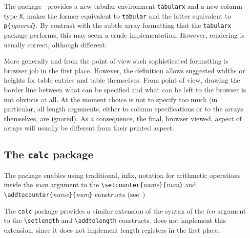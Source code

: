 The 
package~\cite[Section~5.3.5]{latexbis} provides a new tabular
environment \verb+tabularx+ and a new column type \verb+X+. \hevea{}
makes the former equivalent to \verb+tabular+ and the latter
equivalent to \verb+p{+\textit{ignored}\verb+}+.  By contrast with the
subtle array formatting that the \texttt{tabularx} package performs,
this may seem a crude implementation.  However, rendering is usually
correct, although different.

More generally and from the \html{} point of view such sophisticated
formatting is browser job in the first place.
However, the \html{} definition allows suggested widths or heights for
table entries and table themselves.
From \hevea{} point of view, drawing the border line between what can be
specified and what can be left to the browser is not obvious at all.
At the moment \hevea{} choice is not to specify too much (in
particular, all length
arguments, either to column specifications or to the arrays
themselves, are ignored). As a consequence, the final, browser viewed,
aspect of arrays will usually be different from their printed
aspect.

\subsection{The \texttt{calc}\label{calc} package}
%
The 
package enables using traditional, infix, notation for
arithmetic operations
inside the \textit{num} argument to the
\verb+\setcounter{+\textit{name}\verb+}{+\textit{num}\verb+}+
and \verb+\addtocounter{+\textit{name}\verb+}{+\textit{num}\verb+}+
constructs (see~\cite[Section~A.4]{latexbis})

The \texttt{calc} package provides a similar extension of the syntax
of the \textit{len} argument to the \verb+\setlength+ and
\verb+\addtolength+ constructs.
\hevea{} does not implement this extension, since it does not
implement length registers in the first place.


